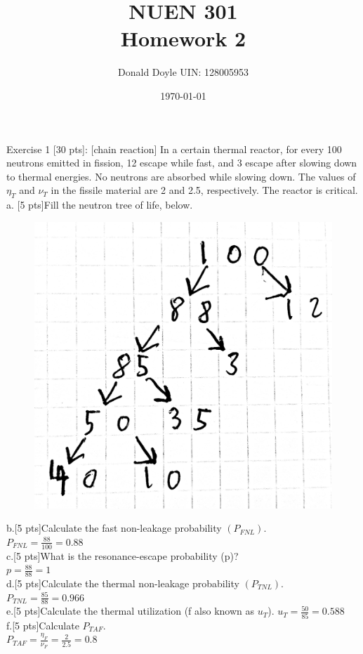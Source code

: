 \documentclass[12pt,fleqn, parskip=full]{scrartcl}
\title{NUEN 301 \\
Homework 2}
\author{Donald Doyle UIN: 128005953}
\date{\today}
\begin{document}
\maketitle

Exercise 1 [30 pts]: [chain reaction] In a certain thermal reactor, for every 100 neutrons emitted in fission, 12 escape while fast, and 3 escape after slowing down to thermal energies. No neutrons are absorbed while slowing down. The values of $\eta_T$ and $\nu_T$ in the fissile material are 2 and 2.5, respectively. The reactor is critical.\\
a. [5 pts]Fill the neutron tree of life, below.
\begin{figure}[H]
	\centering
	\includegraphics[scale=.1]{Image_1_hw_2}
\end{figure}

b.[5 pts]Calculate the fast non-leakage probability $(P_{FNL})$.\\
$P_{FNL} = \frac{88}{100} = 0.88$\\
c.[5 pts]What is the resonance-escape probability (p)?\\
$p = \frac{88}{88} = 1$\\
d.[5 pts]Calculate the thermal non-leakage probability $(P_{TNL})$. \\
$P_{TNL} = \frac{85}{88} = 0.966$\\
e.[5 pts]Calculate the thermal utilization (f also known as $u_T$). 
$u_T = \frac{50}{85}=0.588$\\
f.[5 pts]Calculate $P_{TAF}$. \\
$P_{TAF} = \frac{\eta_F}{\nu_F} = \frac{2}{2.5} = 0.8$\\
\end{document}
